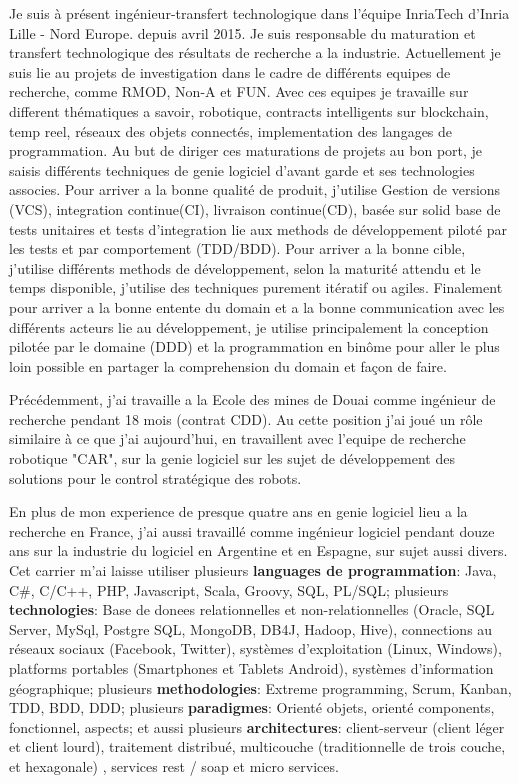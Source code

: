 \documentclass[11pt]{letter} %
\begin{document}
\begin{letter}{}
Je suis à présent ingénieur-transfert technologique dans l'équipe InriaTech d'Inria Lille - Nord Europe. depuis avril 2015. Je suis responsable du maturation et transfert technologique des résultats de recherche a la industrie. 
Actuellement je suis lie au projets de investigation dans le cadre de différents equipes de recherche, comme RMOD, Non-A et FUN. 
Avec ces equipes je travaille sur different thématiques a savoir, robotique, contracts intelligents sur blockchain, temp reel, réseaux des objets connectés, implementation des langages de programmation.
Au but de diriger ces maturations de projets au bon port,  je saisis différents techniques de genie logiciel d'avant garde et ses technologies associes. 
Pour arriver a la bonne qualité de produit, j'utilise  Gestion de versions (VCS), integration continue(CI), livraison continue(CD), basée sur solid base de tests unitaires et tests d'integration lie aux methods de développement piloté par les tests et par comportement (TDD/BDD).
Pour arriver a la bonne cible, j'utilise différents methods de développement, selon la maturité attendu et le temps disponible, j'utilise des techniques purement itératif ou agiles. 
Finalement pour arriver a la bonne entente du domain et a la bonne communication avec les différents acteurs lie au développement, je utilise principalement la conception pilotée par le domaine (DDD) et la programmation en binôme pour aller le plus loin possible en partager la comprehension du domain et façon de faire. 


Précédemment, j'ai travaille a la Ecole des mines de Douai comme ingénieur de recherche pendant 18 mois (contrat CDD). Au cette position j'ai joué un rôle similaire à ce que j'ai aujourd'hui, en travaillent avec l'equipe de recherche robotique "CAR", sur la genie logiciel sur les sujet de développement des solutions pour le control stratégique des robots. 


En plus de mon experience de presque quatre ans en genie logiciel lieu a la recherche en France, j'ai aussi travaillé comme ingénieur logiciel pendant douze ans sur la industrie du logiciel en Argentine et en Espagne, sur sujet aussi divers. 
Cet carrier m'ai laisse utiliser plusieurs \textbf{languages de programmation}: Java, C\#, C/C++, PHP, Javascript, Scala, Groovy, SQL, PL/SQL; 
plusieurs \textbf{technologies}: Base de donees relationnelles et non-relationnelles (Oracle, SQL Server, MySql, Postgre SQL, MongoDB, DB4J, Hadoop, Hive), connections au réseaux sociaux (Facebook, Twitter), systèmes d'exploitation (Linux, Windows), platforms portables (Smartphones et Tablets Android), systèmes d'information géographique; 
plusieurs \textbf{methodologies}: Extreme programming, Scrum, Kanban, TDD, BDD, DDD; 
plusieurs \textbf{paradigmes}: Orienté objets, orienté components, fonctionnel, aspects;  et aussi plusieurs \textbf{architectures}: client-serveur (client léger et client lourd), traitement distribué, multicouche (traditionnelle de trois couche, et hexagonale) , services rest / soap et micro services.



\end{letter}
\end{document}
